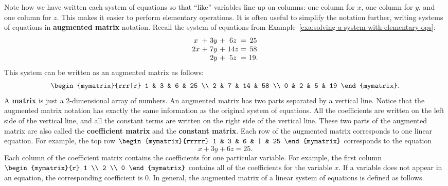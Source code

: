 Note how we have written each system of equations so that ``like''
variables line up on columns: one column for $x$, one column for $y$,
and one column for $z$. This makes it easier to perform elementary
operations. It is often useful to simplify the notation further,
writing systems of equations in \textbf{augmented matrix} notation. Recall the
system of equations from Example~\ref{exa:solving-a-system-with-elementary-ops}:
\begin{equation*}
\begin{array}{c@{~}c@{~}c@{~}c@{~}c@{~}c@{~}c}
x&+&3y&+&6z&=&25 \\
2x&+&7y&+&14z&=&58 \\
&&2y&+&5z&=&19.
\end{array}
\end{equation*}
This system can be written as an augmented matrix as follows:
\begin{equation*}
\begin{mymatrix}{rrr|r}
1 & 3 & 6 & 25 \\
2 & 7 & 14 & 58 \\
0 & 2 & 5 & 19
\end{mymatrix}.
\end{equation*}
A \textbf{matrix} is just a 2-dimensional array of
numbers. An augmented matrix has two parts separated by a vertical
line. Notice that the augmented matrix notation has exactly the same
information as the original system of equations. All the coefficients
are written on the left side of the vertical line, and all the
constant terms are written on the right side of the vertical
line. These two parts of the augmented matrix are also called the
\textbf{coefficient matrix}%
 and the \textbf{constant
  matrix}.  Each
row of the augmented matrix corresponds to one linear equation. For
example, the top row $\begin{mymatrix}{rrrrr} 1 & 3 & 6 & | & 25
\end{mymatrix}$
 corresponds to the equation
\begin{equation*}
x+3y+6z=25.
\end{equation*}
Each column of the coefficient matrix contains the coefficients
for one particular variable. For example, the first column $\begin{mymatrix}{r}
1 \\
2 \\
0
\end{mymatrix}$ contains all of the coefficients for the variable $x$. If a
variable does not appear in an equation, the corresponding coefficient
is $0$. In general, the augmented matrix of a linear system of
equations is defined as follows.

